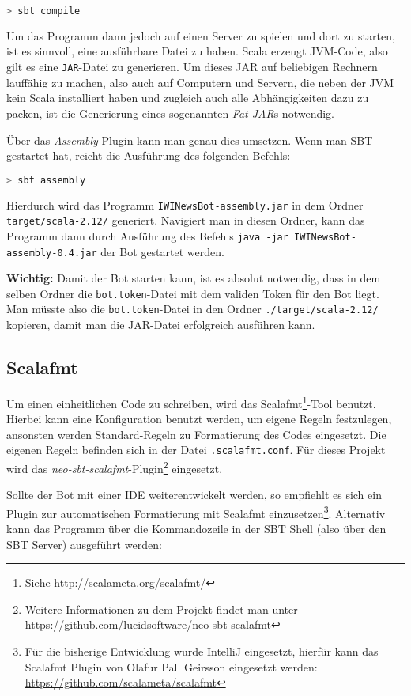 \begin{lstlisting}[language=bash]
> sbt compile
\end{lstlisting}

Um das Programm dann jedoch auf einen Server zu spielen und dort zu starten, ist es sinnvoll, eine ausführbare Datei zu haben. Scala erzeugt JVM-Code, also gilt es eine \texttt{JAR}-Datei zu generieren. Um dieses JAR auf beliebigen Rechnern lauffähig zu machen, also auch auf Computern und Servern, die neben der JVM kein Scala installiert haben und zugleich auch alle Abhängigkeiten dazu zu packen, ist die Generierung eines sogenannten \emph{Fat-JAR}s notwendig.

Über das \emph{Assembly}-Plugin kann man genau dies umsetzen. Wenn man SBT gestartet hat, reicht die Ausführung des folgenden Befehls:

\begin{lstlisting}[language=bash]
> sbt assembly
\end{lstlisting}

Hierdurch wird das Programm \texttt{IWINewsBot\allowbreak-assembly\allowbreak.jar} in dem Ordner \texttt{target\allowbreak/scala-2.12/} generiert. Navigiert man in diesen Ordner, kann das Programm dann durch Ausführung des Befehls \texttt{java -jar IWINewsBot-assembly-0.4.jar} der Bot gestartet werden.

\textbf{Wichtig:} Damit der Bot starten kann, ist es absolut notwendig, dass in dem selben Ordner die \texttt{bot.token}-Datei mit dem validen Token für den Bot liegt. Man müsste also die \texttt{bot.token}-Datei in den Ordner \texttt{./target/scala-2.12/} kopieren, damit man die JAR-Datei erfolgreich ausführen kann.

\subsection{Scalafmt}
Um einen einheitlichen Code zu schreiben, wird das Scalafmt\footnote{Siehe \url{http://scalameta.org/scalafmt/}}-Tool benutzt. Hierbei kann eine Konfiguration benutzt werden, um eigene Regeln festzulegen, ansonsten werden Standard-Regeln zu Formatierung des Codes eingesetzt. Die eigenen Regeln befinden sich in der Datei \texttt{.scalafmt.conf}. Für dieses Projekt wird das \emph{neo-sbt-scalafmt}-Plugin\footnote{Weitere Informationen zu dem Projekt findet man unter \url{https://github.com/lucidsoftware/neo-sbt-scalafmt}} eingesetzt.

Sollte der Bot mit einer IDE weiterentwickelt werden, so empfiehlt es sich ein Plugin zur automatischen Formatierung mit Scalafmt einzusetzen\footnote{Für die bisherige Entwicklung wurde IntelliJ eingesetzt, hierfür kann das Scalafmt Plugin von Olafur Pall Geirsson eingesetzt werden: \url{https://github.com/scalameta/scalafmt}}. Alternativ kann das Programm über die Kommandozeile in der SBT Shell (also über den SBT Server) ausgeführt werden:

